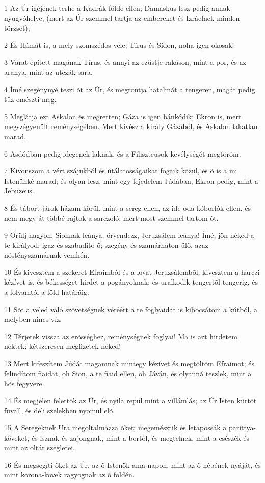 \par 1 Az Úr igéjének terhe a Kadrák földe ellen; Damaskus lesz pedig annak nyugvóhelye, (mert az Úr szemmel tartja az embereket és Izráelnek minden törzsét);
\par 2 És Hámát is, a mely szomszédos vele; Tírus és Sídon, noha igen okosak!
\par 3 Várat épített magának Tírus, és annyi az ezüstje rakáson, mint a por, és az aranya, mint az utczák sara.
\par 4 Ímé szegénynyé teszi õt az Úr, és megrontja hatalmát a tengeren, magát pedig tûz emészti meg.
\par 5 Meglátja ezt Askalon és megretten; Gáza is igen bánkódik; Ekron is, mert megszégyenült reménységében. Mert kivész a király Gázából, és Askalon lakatlan marad.
\par 6 Asdódban pedig idegenek laknak, és a Filiszteusok kevélységét megtöröm.
\par 7 Kivonszom a vért szájukból és útálatosságaikat fogaik közül, és õ is a mi Istenünké marad; és olyan lesz, mint egy fejedelem Júdában, Ekron pedig, mint a Jebuzeus.
\par 8 És tábort járok házam körül, mint a sereg ellen, az ide-oda kóborlók ellen, és nem megy át többé rajtok a sarczoló, mert most szemmel tartom õt.
\par 9 Örülj nagyon, Sionnak leánya, örvendezz, Jeruzsálem leánya! Ímé, jön néked a te királyod; igaz és szabadító õ; szegény és szamárháton ülõ, azaz nõstényszamárnak vemhén.
\par 10 És kivesztem a szekeret Efraimból és a lovat Jeruzsálembõl, kivesztem a harczi kézívet is, és békességet hirdet a pogányoknak; és uralkodik tengertõl tengerig, és a folyamtól a föld határáig.
\par 11 Sõt a veled való szövetségnek véréért a te foglyaidat is kibocsátom a kútból, a melyben nincs víz.
\par 12 Térjetek vissza az erõsséghez, reménységnek foglyai! Ma is azt hirdetem néktek: kétszeresen megfizetek néked!
\par 13 Mert kifeszítem Júdát magamnak mintegy kézívet és megtöltöm Efraimot; és felindítom fiaidat, oh Sion, a te fiaid ellen, oh Jáván, és olyanná teszlek, mint a hõs fegyvere.
\par 14 És megjelen felettök az Úr, és nyila repül mint a villámlás; az Úr Isten kürtöt fuvall, és déli szelekben nyomul elõ.
\par 15 A Seregeknek Ura megoltalmazza õket; megemésztik és letapossák a parittya-köveket, és isznak és zajongnak, mint a bortól, és megtelnek, mint a csészék és mint az oltár szegletei.
\par 16 És megsegíti õket az Úr, az õ Istenök ama napon, mint az õ népének nyáját, és mint korona-kövek ragyognak az õ földén.

